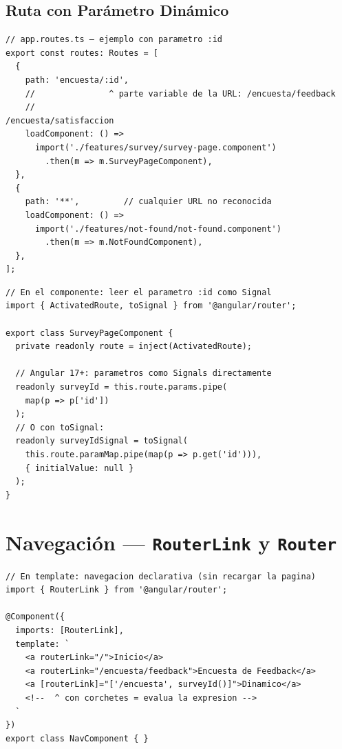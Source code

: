 \documentclass[12pt, a4paper]{article}
\begin{document}
\subsection{ Ruta con Parámetro Dinámico}

\begin{lstlisting}
// app.routes.ts — ejemplo con parametro :id
export const routes: Routes = [
  {
    path: 'encuesta/:id',
    //               ^ parte variable de la URL: /encuesta/feedback
    //                                           /encuesta/satisfaccion
    loadComponent: () =>
      import('./features/survey/survey-page.component')
        .then(m => m.SurveyPageComponent),
  },
  {
    path: '**',         // cualquier URL no reconocida
    loadComponent: () =>
      import('./features/not-found/not-found.component')
        .then(m => m.NotFoundComponent),
  },
];
\end{lstlisting}

\begin{lstlisting}
// En el componente: leer el parametro :id como Signal
import { ActivatedRoute, toSignal } from '@angular/router';

export class SurveyPageComponent {
  private readonly route = inject(ActivatedRoute);

  // Angular 17+: parametros como Signals directamente
  readonly surveyId = this.route.params.pipe(
    map(p => p['id'])
  );
  // O con toSignal:
  readonly surveyIdSignal = toSignal(
    this.route.paramMap.pipe(map(p => p.get('id'))),
    { initialValue: null }
  );
}
\end{lstlisting}

\section{  Navegación --- \texttt{RouterLink} y \texttt{Router}}

\begin{lstlisting}
// En template: navegacion declarativa (sin recargar la pagina)
import { RouterLink } from '@angular/router';

@Component({
  imports: [RouterLink],
  template: `
    <a routerLink="/">Inicio</a>
    <a routerLink="/encuesta/feedback">Encuesta de Feedback</a>
    <a [routerLink]="['/encuesta', surveyId()]">Dinamico</a>
    <!--  ^ con corchetes = evalua la expresion -->
  `
})
export class NavComponent { }
\end{lstlisting}
\end{document}
